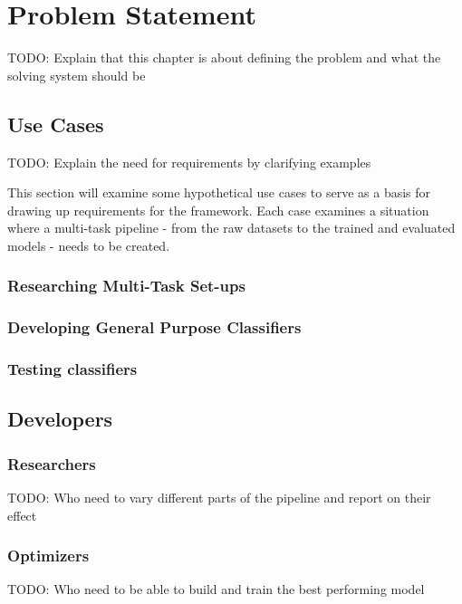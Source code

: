 \chapter{Problem Statement}
TODO: Explain that this chapter is about defining the problem and what the solving system should be

\section{Use Cases}
TODO: Explain the need for requirements by clarifying examples

This section will examine some hypothetical use cases to serve as a basis for drawing up requirements for the framework. Each case examines a situation where a multi-task pipeline - from the raw datasets to the trained and evaluated models - needs to be created. 

\subsection{Researching Multi-Task Set-ups}

\subsection{Developing General Purpose Classifiers}

\subsection{Testing classifiers}



\section{Developers}


\subsection{Researchers}
TODO: Who need to vary different parts of the pipeline and report on their effect

\subsection{Optimizers}
TODO: Who need to be able to build and train the best performing model

